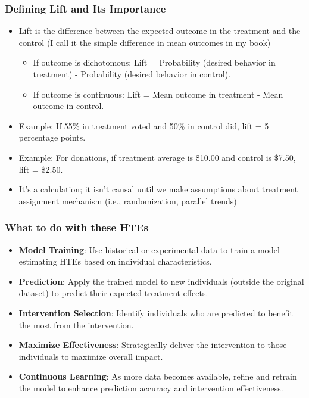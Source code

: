 \documentclass{beamer}
\begin{document}
\begin{frame}
\frametitle{Defining Lift and Its Importance}
\begin{itemize}
    \item Lift is the difference between the expected outcome in the treatment and the control (I call it the simple difference in mean outcomes in my book)
    	\begin{itemize}
    \item If outcome is dichotomous: Lift = Probability (desired behavior in treatment) - Probability (desired behavior in control).
    \item If outcome is continuous: Lift = Mean outcome in treatment - Mean outcome in control.
    \end{itemize}
    \item Example: If 55\% in treatment voted and 50\% in control did, lift = 5 percentage points.
    \item Example: For donations, if treatment average is \$10.00 and control is \$7.50, lift = \$2.50.
    \item It's a calculation; it isn't causal until we make assumptions about treatment assignment mechanism (i.e., randomization, parallel trends)
\end{itemize}
\end{frame}

\begin{frame}
\frametitle{What to do with these HTEs}
\begin{itemize}
    \item \textbf{Model Training}: Use historical or experimental data to train a model estimating HTEs based on individual characteristics.
    \item \textbf{Prediction}: Apply the trained model to new individuals (outside the original dataset) to predict their expected treatment effects.
    \item \textbf{Intervention Selection}: Identify individuals who are predicted to benefit the most from the intervention.
    \item \textbf{Maximize Effectiveness}: Strategically deliver the intervention to those individuals to maximize overall impact.
    \item \textbf{Continuous Learning}: As more data becomes available, refine and retrain the model to enhance prediction accuracy and intervention effectiveness.
\end{itemize}
\end{frame}
\end{document}

